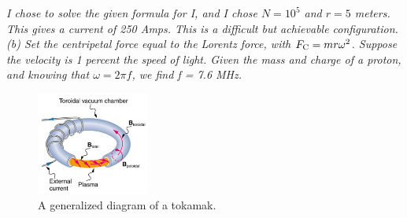 \documentclass[12pt,twocolumn]{article}
\begin{document}
\begin{enumerate}
\textit{I chose to solve the given formula for I, and I chose $N = 10^5$ and $r=5$ meters.  This gives a current of 250 Amps.  This is a difficult but achievable configuration. (b) Set the centripetal force equal to the Lorentz force, with $F_{\rm C} = m r \omega^2$.  Suppose the velocity is 1 percent the speed of light.  Given the mass and charge of a proton, and knowing that $\omega = 2\pi f$, we find f = 7.6 MHz.}
\end{enumerate}
\begin{figure}[hb]
\centering
\includegraphics[width=0.33\textwidth]{tokamak.png}
\caption{\label{fig:B3} A generalized diagram of a tokamak.}
\end{figure}
\end{document}

